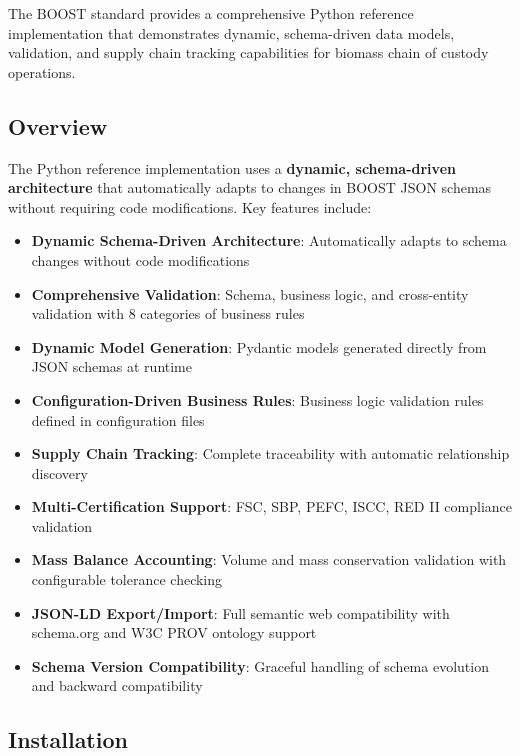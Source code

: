 
The BOOST standard provides a comprehensive Python reference implementation that demonstrates dynamic, schema-driven data models, validation, and supply chain tracking capabilities for biomass chain of custody operations.

\subsection{Overview}
\label{sec:python-overview}

The Python reference implementation uses a \textbf{dynamic, schema-driven architecture} that automatically adapts to changes in BOOST JSON schemas without requiring code modifications. Key features include:

\begin{itemize}
    \item \textbf{Dynamic Schema-Driven Architecture}: Automatically adapts to schema changes without code modifications
    \item \textbf{Comprehensive Validation}: Schema, business logic, and cross-entity validation with 8 categories of business rules
    \item \textbf{Dynamic Model Generation}: Pydantic models generated directly from JSON schemas at runtime
    \item \textbf{Configuration-Driven Business Rules}: Business logic validation rules defined in configuration files
    \item \textbf{Supply Chain Tracking}: Complete traceability with automatic relationship discovery
    \item \textbf{Multi-Certification Support}: FSC, SBP, PEFC, ISCC, RED II compliance validation
    \item \textbf{Mass Balance Accounting}: Volume and mass conservation validation with configurable tolerance checking
    \item \textbf{JSON-LD Export/Import}: Full semantic web compatibility with schema.org and W3C PROV ontology support
    \item \textbf{Schema Version Compatibility}: Graceful handling of schema evolution and backward compatibility
\end{itemize}

\subsection{Installation}
\label{sec:python-installation}

